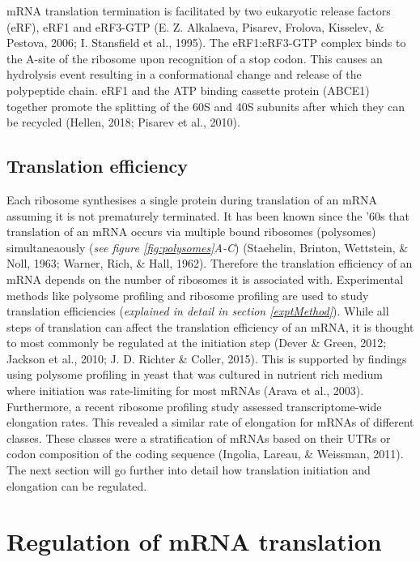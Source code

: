 \documentclass[12pt,openany]{book}
\begin{document}
mRNA translation termination is facilitated by two eukaryotic release
factors (eRF), eRF1 and eRF3-GTP (E. Z. Alkalaeva, Pisarev, Frolova,
Kisselev, \& Pestova, 2006; I. Stansfield et al., 1995). The
eRF1:eRF3-GTP complex binds to the A-site of the ribosome upon
recognition of a stop codon. This causes an hydrolysis event resulting
in a conformational change and release of the polypeptide chain. eRF1
and the ATP binding cassette protein (ABCE1) together promote the
splitting of the 60S and 40S subunits after which they can be recycled
(Hellen, 2018; Pisarev et al., 2010).

\subsection{Translation efficiency}

Each ribosome synthesises a single protein during translation of an mRNA
assuming it is not prematurely terminated. It has been known since the
'60s that translation of an mRNA occurs via multiple bound ribosomes
(polysomes) simultaneaously (\emph{see figure \ref{fig:polysomes}A-C})
(Staehelin, Brinton, Wettstein, \& Noll, 1963; Warner, Rich, \& Hall,
1962). Therefore the translation efficiency of an mRNA depends on the
number of ribosomes it is associated with. Experimental methods like
polysome profiling and ribosome profiling are used to study translation
efficiencies (\emph{explained in detail in section \ref{exptMethod}}).
While all steps of translation can affect the translation efficiency of
an mRNA, it is thought to most commonly be regulated at the initiation
step (Dever \& Green, 2012; Jackson et al., 2010; J. D. Richter \&
Coller, 2015). This is supported by findings using polysome profiling in
yeast that was cultured in nutrient rich medium where initiation was
rate-limiting for most mRNAs (Arava et al., 2003). Furthermore, a recent
ribosome profiling study assessed transcriptome-wide elongation rates.
This revealed a similar rate of elongation for mRNAs of different
classes. These classes were a stratification of mRNAs based on their
UTRs or codon composition of the coding sequence (Ingolia, Lareau, \&
Weissman, 2011). The next section will go further into detail how
translation initiation and elongation can be regulated. \newline
\section{Regulation of mRNA translation} \label{regmRNA}
\end{document}
